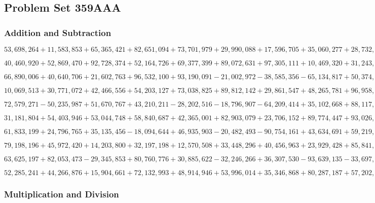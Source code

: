 \hypertarget{problem-set-359aaa}{%
\subsection{Problem Set 359AAA}\label{problem-set-359aaa}}

\hypertarget{addition-and-subtraction}{%
\subsubsection{Addition and
Subtraction}\label{addition-and-subtraction}}

\(53,698,264+11,583,853+65,365,421+82,651,094+73,701,979+29,990,088+17,596,705+35,060,277+28,732,019+43,986,519\)

\(40,460,920+52,869,470+92,728,374+52,164,726+69,377,399+89,072,631+97,305,111+10,469,320+31,243,226+18,725,642\)

\(66,890,006+40,640,706+21,602,763+96,532,100+93,190,091-21,002,972-38,585,356-65,134,817+50,374,346-90,715,253\)

\(10,069,513+30,771,072+42,466,556+54,203,127+73,038,825+89,812,142+29,861,547+48,265,781+96,958,050+44,338,514\)

\(72,579,271-50,235,987+51,670,767+43,210,211-28,202,516-18,796,907-64,209,414+35,102,668+88,117,870+73,176,921\)

\(31,181,804+54,403,946+53,044,748+58,840,687+42,365,001+82,903,079+23,706,152+89,774,447+93,026,478+35,510,636\)

\(61,833,199+24,796,765+35,135,456-18,094,644+46,935,903-20,482,493-90,754,161+43,634,691+59,219,588-90,179,103\)

\(79,198,196+45,972,420+14,203,800+32,197,198+12,570,508+33,448,296+40,456,963+23,929,428+85,841,750+12,542,785\)

\(63,625,197+82,053,473-29,345,853+80,760,776+30,885,622-32,246,266+36,307,530-93,639,135-33,697,179+23,639,045\)

\(52,285,241+44,266,876+15,904,661+72,132,993+48,914,946+53,996,014+35,346,868+80,287,187+57,202,349+29,514,691\)

\hypertarget{multiplication-and-division}{%
\subsubsection{Multiplication and
Division}\label{multiplication-and-division}}

